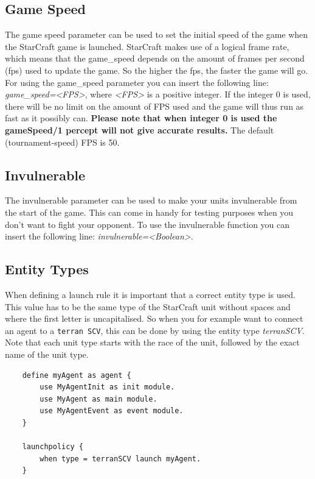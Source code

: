 \subsection{Game Speed}
\label{game speed}
The game speed parameter can be used to set the initial speed of the game when the StarCraft game is launched. StarCraft makes use of a logical frame rate, which means that the game\_speed depends on the amount of frames per second (fps) used to update the game. So the higher the fps, the faster the game will go. For using the game\_speed parameter you can insert the following line: \textit{game\_speed=<FPS>}, where \textit{<FPS>} is a positive integer. If the integer 0 is used, there will be no limit on the amount of FPS used and the game will thus run as fast as it possibly can. \textbf{Please note that when integer 0 is used the gameSpeed/1 percept will not give accurate results.} The default (tournament-speed) FPS is 50.

\subsection{Invulnerable}
\label{invulnerable}
The invulnerable parameter can be used to make your units invulnerable from the start of the game. This can come in handy for testing purposes when you don't want to fight your opponent. To use the invulnerable function you can insert the following line: \textit{invulnerable=<Boolean>}.

\subsection{Entity Types}
When defining a launch rule it is important that a correct entity type is used. This value has to be the same type of the StarCraft unit without spaces and where the first letter is uncapitalised. So when you for example want to connect an agent to a \texttt{terran SCV}, this can be done by using the entity type \textit{terranSCV}. Note that each unit type starts with the race of the unit, followed by the exact name of the unit type.

\begin{verbatim}
    define myAgent as agent {
        use MyAgentInit as init module.
        use MyAgent as main module.
        use MyAgentEvent as event module.
    }

    launchpolicy {
        when type = terranSCV launch myAgent.
    }
\end{verbatim}


